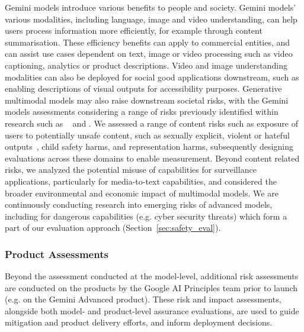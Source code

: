 Gemini models introduce various benefits to people and society. Gemini models’ various modalities, including language, image and video understanding, can help users process information more efficiently, for example through content summarisation. These efficiency benefits can apply to commercial entities, and can assist use cases dependent on text, image or video processing such as video captioning, analytics or product descriptions.  Video and image understanding modalities can also be deployed for social good applications downstream, such as enabling descriptions of visual outputs for accessibility purposes. Generative multimodal models may also raise downstream societal risks, with the Gemini models assessments considering a range of risks previously identified within research such as ~\citet{weidinger-2021-ethical} and \citet{shelby2023identifying}. We assessed a range of content risks such as exposure of users to potentially unsafe content, such as sexually explicit, violent or hateful outputs~\citep{weidinger-2021-ethical}, child safety harms, and representation harms, subsequently designing evaluations across these domains to enable measurement. Beyond content related risks, we analyzed the potential misuse of capabilities for surveillance applications, particularly for media-to-text capabilities, and considered the broader environmental and economic impact of multimodal models. We are continuously conducting research into emerging risks of advanced models, including for dangerous capabilities (e.g. cyber security threats) which form a part of our evaluation approach (Section~\ref{sec:safety_eval}).

\subsubsection{Product Assessments} 

Beyond the assessment conducted at the model-level, additional risk assessments are conducted on the products by the Google AI Principles team prior to launch (e.g. on the Gemini Advanced product). These risk and impact assessments, alongside both model- and product-level assurance evaluations, are used to guide mitigation and product delivery efforts, and inform deployment decisions.

